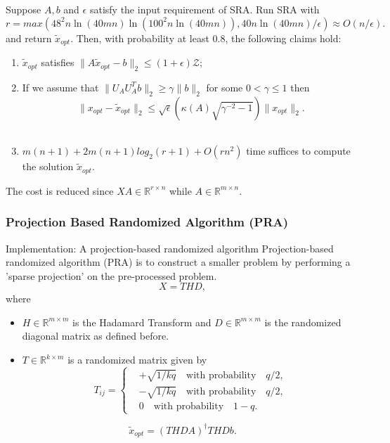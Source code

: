 

\begin{theorem}
	Suppose $A,b$ and $\epsilon$ satisfy the input requirement of SRA. Run SRA with
	\begin{equation}\label{eq22}
	r = max \left( 48^2 n \ln(40 mn) \ln(100^2 n \ln(40 mn)) , 40n \ln(40 mn) /\epsilon \right)
	\approx O(n/\epsilon).
	\end{equation}
	and return $\tilde{x}_{opt}.$ Then, with probability at least $0.8$, the following claims hold:
	\begin{enumerate}
		\item $\tilde{x}_{opt}$ satisfies $\| A \tilde{x}_{opt} - b \|_2  \leq (1 + \epsilon) \mathcal{Z}; $ \\
		\item If we assume that $\| U_A  U_A^T b \|_2 \geq \gamma \|b\|_2 $ for some $0< \gamma \leq 1$ then
		$$
		\| x_{opt} - \tilde{x}_{opt}\|_2 \leq \sqrt{\epsilon} \left( \kappa(A) \sqrt{\gamma^{-2} -1} \right) \| x_{opt}\|_2.
		$$\\
		\item $m(n+1) + 2m(n+1)log_2(r+1) + O(rn^2)$ time suffices to compute the solution $\tilde{x}_{opt}. $
	\end{enumerate}
\end{theorem}
The cost is reduced since $XA \in \mathbb{R}^{r \times n}$ while $A \in \mathbb{R}^{m \times n}.$


\subsubsection{Projection Based Randomized Algorithm (PRA)}
Implementation: A projection-based randomized algorithm
Projection-based randomized algorithm (PRA) is to construct a smaller problem by performing a 'sparse projection' on the pre-processed problem.
$$
X = THD,
$$
where
\begin{itemize}
	\item $H \in \mathbb{R}^{m \times m}$ is the Hadamard Transform and $D \in \mathbb{R}^{m \times m }$ is the randomized diagonal matrix as defined before. \\
	\item $T \in \mathbb{R}^{k \times m}$ is a randomized matrix given by
	$$
	T_{ij} = \begin{cases} &+ \sqrt{1/kq} \quad \text{with probability} \quad q/2, \\
	&-  \sqrt{1/kq} \quad \text{with probability} \quad q/2, \\
	& 0 \quad \text{with probability} \quad 1-q.
	\end{cases}
	$$
\end{itemize}
$$\tilde{x}_{opt} = (THDA)^{\dagger} THDb. $$

